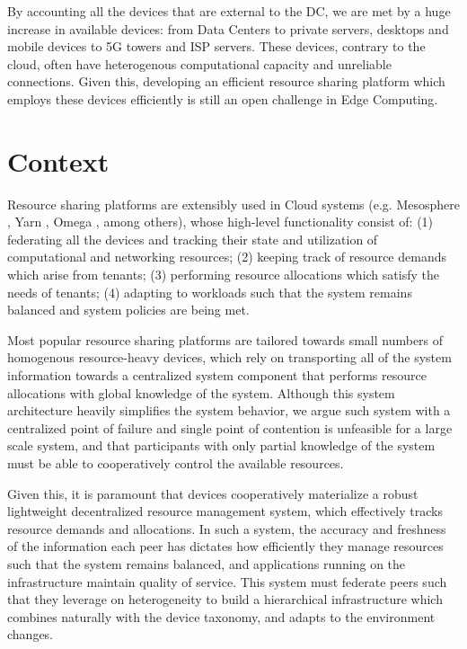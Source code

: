 By accounting all the devices that are external to the DC, we are met by a huge increase in available devices: from Data Centers to private servers, desktops and mobile devices to 5G towers and ISP servers. These devices, contrary to the cloud, often have heterogenous computational capacity and unreliable connections. Given this, developing an efficient resource sharing platform which employs these devices efficiently is still an open challenge in Edge Computing. 

\section{Context}

Resource sharing platforms are extensibly used in Cloud systems (e.g. Mesosphere \cite{hindman2011mesos}, Yarn \cite{Vavilapalli2013ApacheHY}, Omega \cite{41684}, among others), whose high-level functionality consist of: (1) federating all the devices and tracking their state and utilization of computational and networking resources; (2) keeping track of resource demands which arise from tenants; (3) performing resource allocations which satisfy the needs of tenants; (4) adapting to workloads such that the system remains balanced and system policies are being met.

Most popular resource sharing platforms are tailored towards small numbers of homogenous resource-heavy devices, which rely on transporting all of the system information towards a centralized system component that performs resource allocations with global knowledge of the system. Although this system architecture heavily simplifies the system behavior, we argue such system with a centralized point of failure and single point of contention is unfeasible for a large scale system, and that participants with only partial knowledge of the system must be able to cooperatively control the available resources. 

Given this, it is paramount that devices cooperatively materialize a robust lightweight decentralized resource  management system, which effectively tracks resource demands and allocations. In such a system, the accuracy and freshness of the information each peer has dictates how efficiently they manage resources such that the system remains balanced, and applications running on the infrastructure maintain quality of service. This system must federate peers such that they leverage on heterogeneity to build a hierarchical infrastructure which combines naturally with the device taxonomy, and adapts to the environment changes. 

